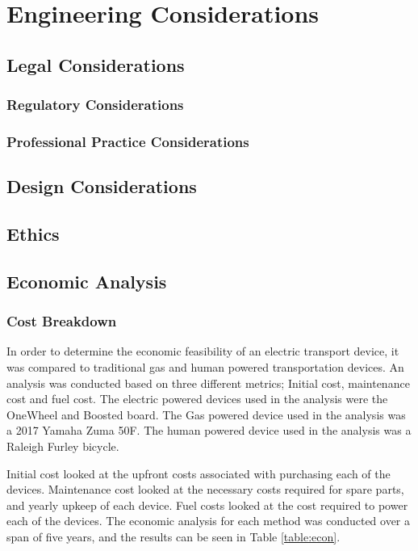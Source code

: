 \section{Engineering Considerations}
\subsection{Legal Considerations}
\subsubsection{Regulatory Considerations}
\subsubsection{Professional Practice Considerations}
\subsection{Design Considerations}
\subsection{Ethics}
\subsection{Economic Analysis}
\subsubsection{Cost Breakdown}
In order to determine the economic feasibility of an electric transport device, it was compared to traditional gas and human powered transportation devices.
An analysis was conducted based on three different metrics; Initial cost, maintenance cost and fuel cost.
The electric powered devices used in the analysis were the OneWheel and Boosted board.
The Gas powered device used in the analysis was a 2017 Yamaha Zuma 50F.
The human powered device used in the analysis was a  Raleigh Furley bicycle.
\par
Initial cost looked at the upfront costs associated with purchasing each of the devices.
Maintenance cost looked at the necessary costs required for spare parts, and yearly upkeep of each device. 
Fuel costs looked at the cost required to power each of the devices.	
The economic analysis for each method was conducted over a span of five years, and the results can be seen in Table \ref{table:econ}.

